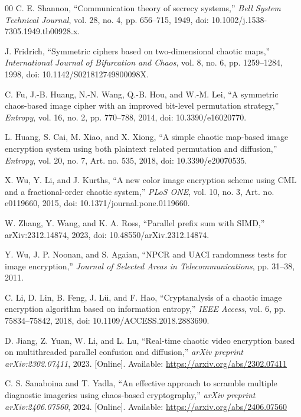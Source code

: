 \documentclass[twocolumn,runningheads]{svjour3}
\begin{document}
\begin{thebibliography}{00}
 C. E. Shannon, ``Communication theory of secrecy
systems,'' \emph{Bell System Technical Journal}, vol. 28, no. 4,
pp. 656--715, 1949, doi: 10.1002/j.1538-7305.1949.tb00928.x.

 J. Fridrich, ``Symmetric ciphers based on
two-dimensional chaotic maps,'' \emph{International Journal of Bifurcation
and Chaos}, vol. 8, no. 6, pp. 1259--1284, 1998,
doi: 10.1142/S021812749800098X.

 C. Fu, J.-B. Huang, N.-N. Wang, Q.-B. Hou, and W.-M. Lei,
``A symmetric chaos-based image cipher with an improved bit-level permutation
strategy,'' \emph{Entropy}, vol. 16, no. 2, pp. 770--788, 2014,
doi: 10.3390/e16020770.

 L. Huang, S. Cai, M. Xiao, and X. Xiong, ``A simple
chaotic map-based image encryption system using both plaintext related
permutation and diffusion,'' \emph{Entropy}, vol. 20, no. 7, Art. no. 535,
2018, doi: 10.3390/e20070535.

 X. Wu, Y. Li, and J. Kurths, ``A new color image encryption
scheme using CML and a fractional-order chaotic system,'' \emph{PLoS ONE},
vol. 10, no. 3, Art. no. e0119660, 2015,
doi: 10.1371/journal.pone.0119660.

 W. Zhang, Y. Wang, and K. A. Ross, ``Parallel prefix sum
with SIMD,'' arXiv:2312.14874, 2023, doi: 10.48550/arXiv.2312.14874.

 Y. Wu, J. P. Noonan, and S. Agaian, ``NPCR and UACI
randomness tests for image encryption,'' \emph{Journal of Selected Areas in
Telecommunications}, pp. 31--38, 2011.

 C. Li, D. Lin, B. Feng, J. L\"u, and F. Hao,
``Cryptanalysis of a chaotic image encryption algorithm based on information
entropy,'' \emph{IEEE Access}, vol. 6, pp. 75834--75842, 2018,
doi: 10.1109/ACCESS.2018.2883690.

 D. Jiang, Z. Yuan, W. Li, and L. Lu, ``Real-time chaotic
video encryption based on multithreaded parallel confusion and diffusion,''
\emph{arXiv preprint arXiv:2302.07411}, 2023. [Online]. Available:
\url{https://arxiv.org/abs/2302.07411}

 C. S. Sanaboina and T. Yadla, ``An effective approach
to scramble multiple diagnostic imageries using chaos-based cryptography,''
\emph{arXiv preprint arXiv:2406.07560}, 2024. [Online]. Available:
\url{https://arxiv.org/abs/2406.07560}


\end{thebibliography}
\end{document}
